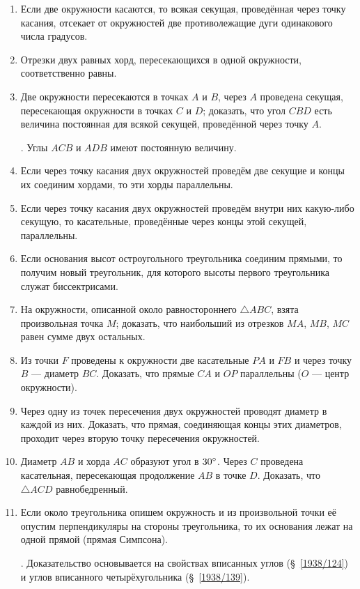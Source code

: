 \documentclass[twoside]{book}
\begin{document}
\begin{enumerate}[resume]

 \item
Если две окружности касаются, то всякая секущая, проведённая через точку касания, отсекает от окружностей две противолежащие дуги одинакового числа градусов.

 \item
Отрезки двух равных хорд, пересекающихся в одной окружности, соответственно равны.

 \item
Две окружности пересекаются в точках $A$ и $B$, через $A$ проведена секущая, пересекающая окружности в точках $C$ и $D$;
доказать, что угол $CBD$ есть величина постоянная для всякой секущей, проведённой через точку $A$.

\smallskip
{}.
Углы $ACB$ и $ADB$ имеют постоянную величину.

 \item
Если через точку касания двух окружностей проведём две секущие и концы их соединим хордами, то эти хорды параллельны.

 \item
Если через точку касания двух окружностей проведём внутри них какую-либо секущую, то касательные, проведённые через концы этой секущей, параллельны.

 \item
Если основания высот остроугольного треугольника соединим прямыми, то получим новый треугольник, для которого высоты первого треугольника служат биссектрисами. 

 \item
На окружности, описанной около равностороннего $\triangle ABC$, взята произвольная точка $M$;
доказать, что наибольший из отрезков $MA$, $MB$, $MC$ равен сумме двух остальных.

 \item
Из точки $F$ проведены к окружности две касательные $PA$ и $FB$ и через точку $B$ — диаметр $BC$.
Доказать, что прямые $CA$ и $OP$ параллельны ($O$ — центр окружности).

 \item
Через одну из точек пересечения двух окружностей проводят диаметр в каждой из них.
Доказать, что прямая, соединяющая концы этих диаметров, проходит через вторую точку пересечения окружностей.

 \item
Диаметр $AB$ и хорда $AC$ образуют угол в $30\degree$.
Через $C$ проведена касательная, пересекающая продолжение $AB$ в точке $D$.
Доказать, что $\triangle ACD$ равнобедренный.

 \item
Если около треугольника опишем окружность и из произвольной точки её опустим перпендикуляры на стороны треугольника, то их основания лежат на одной прямой (прямая Симпсона).

\smallskip
{}.
Доказательство основывается на свойствах вписанных углов (§~\ref{1938/124}) и углов вписанного четырёхугольника (§~\ref{1938/139}).


\end{enumerate}
\end{document}
